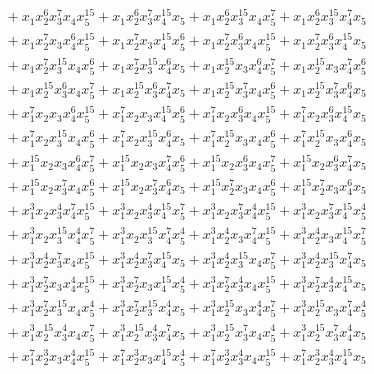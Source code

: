 \documentclass[reqno]{amsart}
\theoremstyle{plain}
\theoremstyle{definition}
\theoremstyle{plain}
\theoremstyle{definition}
\numberwithin{equation}{section}
\begin{document}
\begin{align*}
&\quad + x_1x_2^{6}x_3^{7}x_4x_5^{15} + x_1x_2^{6}x_3^{7}x_4^{15}x_5 + x_1x_2^{6}x_3^{15}x_4x_5^{7} + x_1x_2^{6}x_3^{15}x_4^{7}x_5\\ 
&\quad + x_1x_2^{7}x_3x_4^{6}x_5^{15} + x_1x_2^{7}x_3x_4^{15}x_5^{6} + x_1x_2^{7}x_3^{6}x_4x_5^{15} + x_1x_2^{7}x_3^{6}x_4^{15}x_5\\ 
&\quad + x_1x_2^{7}x_3^{15}x_4x_5^{6} + x_1x_2^{7}x_3^{15}x_4^{6}x_5 + x_1x_2^{15}x_3x_4^{6}x_5^{7} + x_1x_2^{15}x_3x_4^{7}x_5^{6}\\ 
&\quad + x_1x_2^{15}x_3^{6}x_4x_5^{7} + x_1x_2^{15}x_3^{6}x_4^{7}x_5 + x_1x_2^{15}x_3^{7}x_4x_5^{6} + x_1x_2^{15}x_3^{7}x_4^{6}x_5\\ 
&\quad + x_1^{7}x_2x_3x_4^{6}x_5^{15} + x_1^{7}x_2x_3x_4^{15}x_5^{6} + x_1^{7}x_2x_3^{6}x_4x_5^{15} + x_1^{7}x_2x_3^{6}x_4^{15}x_5\\ 
&\quad + x_1^{7}x_2x_3^{15}x_4x_5^{6} + x_1^{7}x_2x_3^{15}x_4^{6}x_5 + x_1^{7}x_2^{15}x_3x_4x_5^{6} + x_1^{7}x_2^{15}x_3x_4^{6}x_5\\ 
&\quad + x_1^{15}x_2x_3x_4^{6}x_5^{7} + x_1^{15}x_2x_3x_4^{7}x_5^{6} + x_1^{15}x_2x_3^{6}x_4x_5^{7} + x_1^{15}x_2x_3^{6}x_4^{7}x_5\\ 
&\quad + x_1^{15}x_2x_3^{7}x_4x_5^{6} + x_1^{15}x_2x_3^{7}x_4^{6}x_5 + x_1^{15}x_2^{7}x_3x_4x_5^{6} + x_1^{15}x_2^{7}x_3x_4^{6}x_5\\ 
&\quad + x_1^{3}x_2x_3^{4}x_4^{7}x_5^{15} + x_1^{3}x_2x_3^{4}x_4^{15}x_5^{7} + x_1^{3}x_2x_3^{7}x_4^{4}x_5^{15} + x_1^{3}x_2x_3^{7}x_4^{15}x_5^{4}\\ 
&\quad + x_1^{3}x_2x_3^{15}x_4^{4}x_5^{7} + x_1^{3}x_2x_3^{15}x_4^{7}x_5^{4} + x_1^{3}x_2^{4}x_3x_4^{7}x_5^{15} + x_1^{3}x_2^{4}x_3x_4^{15}x_5^{7}\\ 
&\quad + x_1^{3}x_2^{4}x_3^{7}x_4x_5^{15} + x_1^{3}x_2^{4}x_3^{7}x_4^{15}x_5 + x_1^{3}x_2^{4}x_3^{15}x_4x_5^{7} + x_1^{3}x_2^{4}x_3^{15}x_4^{7}x_5\\ 
&\quad + x_1^{3}x_2^{7}x_3x_4^{4}x_5^{15} + x_1^{3}x_2^{7}x_3x_4^{15}x_5^{4} + x_1^{3}x_2^{7}x_3^{4}x_4x_5^{15} + x_1^{3}x_2^{7}x_3^{4}x_4^{15}x_5\\ 
&\quad + x_1^{3}x_2^{7}x_3^{15}x_4x_5^{4} + x_1^{3}x_2^{7}x_3^{15}x_4^{4}x_5 + x_1^{3}x_2^{15}x_3x_4^{4}x_5^{7} + x_1^{3}x_2^{15}x_3x_4^{7}x_5^{4}\\ 
&\quad + x_1^{3}x_2^{15}x_3^{4}x_4x_5^{7} + x_1^{3}x_2^{15}x_3^{4}x_4^{7}x_5 + x_1^{3}x_2^{15}x_3^{7}x_4x_5^{4} + x_1^{3}x_2^{15}x_3^{7}x_4^{4}x_5\\ 
&\quad + x_1^{7}x_2^{3}x_3x_4^{4}x_5^{15} + x_1^{7}x_2^{3}x_3x_4^{15}x_5^{4} + x_1^{7}x_2^{3}x_3^{4}x_4x_5^{15} + x_1^{7}x_2^{3}x_3^{4}x_4^{15}x_5\\ 

\end{align*}
\end{document}
